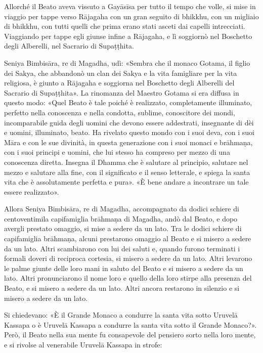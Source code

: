 
Allorché il Beato aveva vissuto a Gayāsīsa per tutto il tempo che volle, si mise
in viaggio per tappe verso Rājagaha con un gran seguito di bhikkhu, con un
migliaio di bhikkhu, con tutti quelli che prima erano stati asceti dai capelli
intrecciati. Viaggiando per tappe egli giunse infine a Rājagaha, e lì soggiornò
nel Boschetto degli Alberelli, nel Sacrario di Supaṭṭhita.

Seniya Bimbisāra, re di Magadha, udì: «Sembra che il monaco Gotama, il figlio
dei Sakya, che abbandonò un clan dei Sakya e la vita famigliare per la vita
religiosa, è giunto a Rājagaha e soggiorna nel Boschetto degli Alberelli del
Sacrario di Supaṭṭhita». La rinomanza del Maestro Gotama si era diffusa in
questo modo: «Quel Beato è tale poiché è realizzato, completamente illuminato,
perfetto nella conoscenza e nella condotta, sublime, conoscitore dei mondi,
incomparabile guida degli uomini che devono essere addestrati, insegnante di dèi
e uomini, illuminato, beato. Ha rivelato questo mondo con i suoi deva, con i
suoi Māra e con le sue divinità, in questa generazione con i suoi monaci e
brāhmaṇa, con i suoi principi e uomini, che lui stesso ha compreso per mezzo di
una conoscenza diretta. Insegna il Dhamma che è salutare al principio, salutare
nel mezzo e salutare alla fine, con il significato e il senso letterale, e
spiega la santa vita che è assolutamente perfetta e pura». «È bene andare a
incontrare un tale essere realizzato».

Allora Seniya Bimbisāra, re di Magadha, accompagnato da dodici schiere di
centoventimila capifamiglia brāhmaṇa di Magadha, andò dal Beato, e dopo avergli
prestato omaggio, si mise a sedere da un lato. Tra le dodici schiere di
capifamiglia brāhmaṇa, alcuni prestarono omaggio al Beato e si misero a sedere
da un lato. Altri scambiarono con lui dei saluti e, quando furono terminati i
formali doveri di reciproca cortesia, si misero a sedere da un lato. Altri
levarono le palme giunte delle loro mani in saluto del Beato e si misero a
sedere da un lato. Altri pronunciarono il nome loro e quello della loro stirpe
alla presenza del Beato, e si misero a sedere da un lato. Altri ancora restarono
in silenzio e si misero a sedere da un lato.

Si chiedevano: «È il Grande Monaco a condurre la santa vita sotto Uruvelā
Kassapa o è Uruvelā Kassapa a condurre la santa vita sotto il Grande Monaco?».
Però, il Beato nella sua mente fu consapevole del pensiero sorto nella loro
mente, e si rivolse al venerabile Uruvelā Kassapa in strofe:


